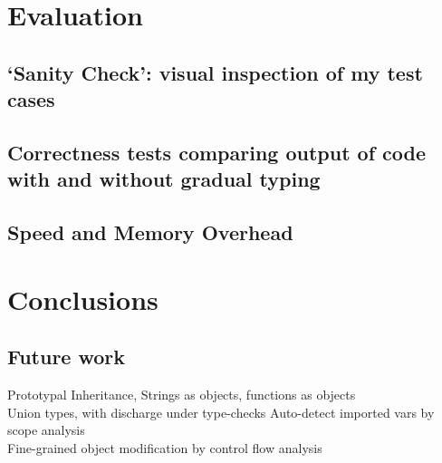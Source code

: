 \documentclass[12pt,a4paper,twoside,openright]{report}
\begin{document}
\printbibliography{}

\chapter{Evaluation}\label{evaluation}
\section{`Sanity Check': visual inspection of my test cases}
\section{Correctness tests comparing output of code with and without gradual typing}
\section{Speed and Memory Overhead}


\chapter{Conclusions}
\section{Future work}
Prototypal Inheritance, Strings as objects, functions as objects \\
Union types, with discharge under type-checks
Auto-detect imported vars by scope analysis \\
Fine-grained object modification by control flow analysis
\end{document}
